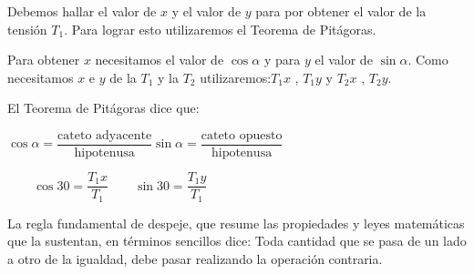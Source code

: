 \documentclass{article}
\begin{document}

Debemos hallar el valor de $x$ y el valor de $y$ para por obtener el valor de la tensi\'on $T_1$. Para lograr esto utilizaremos el Teorema de Pit\'agoras.

Para obtener $x$ necesitamos el valor de $\cos \alpha$ y para $y$ el valor de $\sin \alpha$. Como necesitamos $x$ e $y$ de la $T_1$ y la $T_2$ utilizaremos:\newline $T_1x$ , $T_1y$ y $T_2x$ , $T_2y$.\newline


El Teorema de Pit\'agoras dice que:\newline

\qquad $\cos \alpha = \dfrac{\text{cateto adyacente}}{\text{hipotenusa}}$\qquad $\sin \alpha = \dfrac{\text{cateto opuesto}}{\text{hipotenusa}}$\newline\newline


\begin{math}
  \qquad \cos 30 = \dfrac{T_1x}{T_1}
  \qquad \sin 30 = \dfrac{T_1y}{T_1}
\end{math}

La regla fundamental de despeje, que resume las propiedades y leyes matemáticas que la sustentan, en términos sencillos dice:\newline 
Toda cantidad que se pasa de un lado a otro de la igualdad, debe pasar realizando la operación contraria.
\end{document}
